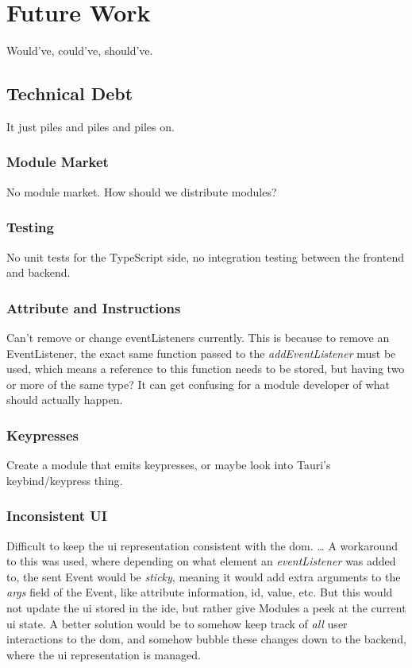 \chapter{Future Work}

Would've, could've, should've.


\section{Technical Debt}

It just piles and piles and piles on.

\subsection{Module Market}

No module market. How should we distribute modules?

\subsection{Testing}

No unit tests for the TypeScript side, no integration testing between the
frontend and backend.

\subsection{Attribute and Instructions}

Can't remove or change eventListeners currently. This is because to remove an
EventListener, the exact same function passed to the \textit{addEventListener}
must be used, which means a reference to this function needs to be stored, but
having two or more of the same type? It can get confusing for a module developer
of what should actually happen.

\subsection{Keypresses}

Create a module that emits keypresses, or maybe look into Tauri's
keybind/keypress thing.

\subsection{Inconsistent UI}

Difficult to keep the \gls{ui} representation consistent with the \gls{dom}.
\dots
A workaround to this was used, where depending on what element an
\textit{eventListener} was added to, the sent Event would be \textit{sticky},
meaning it would add extra arguments to the \textit{args} field of the Event,
like attribute information, id, value, etc. But this would not update the
\gls{ui} stored in the \gls{ide}, but rather give Modules a peek at the current
\gls{ui} state. A better solution would be to somehow keep track of \textit{all}
user interactions to the \gls{dom}, and somehow bubble these changes down to the
backend, where the \gls{ui} representation is managed.

